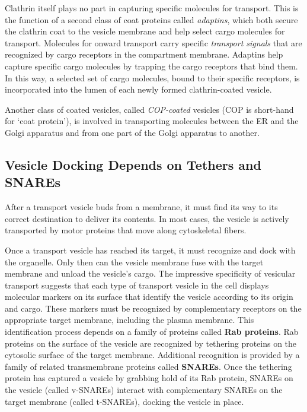 Clathrin itself plays no part in capturing specific molecules for transport.
This is the function of a second class of coat proteins called \textit{adaptins},
which both secure the clathrin coat to the vesicle membrane and help
select cargo molecules for transport. Molecules for onward transport
carry specific \textit{transport signals} that are recognized by cargo receptors in the
compartment membrane. Adaptins help capture specific cargo molecules
by trapping the cargo receptors that bind them. In this way, a selected set
of cargo molecules, bound to their specific receptors, is incorporated into
the lumen of each newly formed clathrin-coated vesicle.

Another class of coated vesicles, called \textit{COP-coated} vesicles (COP is short-hand 
for ‘coat protein’), is involved in transporting molecules between
the ER and the Golgi apparatus and from one part of the Golgi apparatus
to another.

\subsection{Vesicle Docking Depends on Tethers and SNAREs}

After a transport vesicle buds from a membrane, it must find its way to
its correct destination to deliver its contents. In most cases, the vesicle
is actively transported by motor proteins that move along cytoskeletal
fibers.

Once a transport vesicle has reached its target, it must recognize and
dock with the organelle. Only then can the vesicle membrane fuse with
the target membrane and unload the vesicle’s cargo. The impressive specificity 
of vesicular transport suggests that each type of transport vesicle
in the cell displays molecular markers on its surface that identify the
vesicle according to its origin and cargo. These markers must be recognized 
by complementary receptors on the appropriate target membrane,
including the plasma membrane. This identification process depends on
a family of proteins called \textbf{Rab proteins}. Rab proteins on the surface of
the vesicle are recognized by tethering proteins on the cytosolic surface of
the target membrane. Additional recognition is provided by a family of
related transmembrane proteins called \textbf{SNAREs}. Once the tethering protein 
has captured a vesicle by grabbing hold of its Rab protein, SNAREs
on the vesicle (called v-SNAREs) interact with complementary SNAREs
on the target membrane (called t-SNAREs), docking the vesicle in place.

